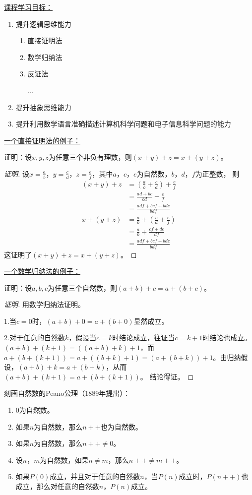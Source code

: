 \documentclass{article}
\begin{document}
\begin{CJK}{UTF8}{gbsn}
\underline{课程学习目标：}
\begin{enumerate}
\item 提升逻辑思维能力
  \begin{enumerate}
  \item 直接证明法
  \item 数学归纳法
  \item 反证法

    ...
  \end{enumerate}
\item 提升抽象思维能力
\item 提升利用数学语言准确描述计算机科学问题和电子信息科学问题的能力
\end{enumerate}

\underline{一个直接证明法的例子：}

证明：设$x, y, z$为任意三个非负有理数，则$(x + y) + z = x + (y + z)$。
\begin{proof}[证明]
  设$x=\frac{a}{b}$，$y=\frac{c}{d}$，$z=\frac{e}{f}$，其中$a$，$c$，$e$为自然数，$b$，$d$，$f$为正整数，
  则
  \begin{align*}
    (x + y) + z&=(\frac{a}{b}+\frac{c}{d})+\frac{e}{f}\\
               &=\frac{ad+bc}{bd}+\frac{e}{f}\\
    &=\frac{adf+bcf+bde}{bdf}\\
    x + (y + z)&=\frac{a}{b}+(\frac{c}{d}+\frac{e}{f})\\
               &=\frac{a}{b} + \frac{cf + de}{df}\\
    &=\frac{adf+bcf+bde}{bdf}    
  \end{align*}
  这证明了$(x + y) + z = x + (y + z)$。
\end{proof}

\underline{一个数学归纳法的例子：}

证明：设$a, b, c$为任意三个自然数，则$(a + b) + c = a + (b + c)$。

\begin{proof}[证明]
  用数学归纳法证明。

  1.当$c=0$时，$(a+b)+0=a+(b+0)$显然成立。

  2.对于任意的自然数$k$，假设当$c=k$时结论成立，往证当$c=k+1$时结论也成立。$(a+b)+(k+1)=((a+b)+k)+1$，而$a+(b+(k+1))=a+((b+k)+1)=(a+(b+k))+1$。由归纳假设，$(a+b)+k=a+(b+k)$，从而$(a+b)+(k+1)=a+(b+(k+1))$。
  结论得证。
\end{proof}


刻画自然数的Peano公理（1889年提出）：
\begin{enumerate}
    \item 0为自然数。
    \item 如果$n$为自然数，那么$n++$也为自然数。
    \item 如果$n$为自然数，那么$n++ \neq 0$。
    \item 设$n$，$m$为自然数，如果$n \neq m$，那么$n++ \neq m++$。
    \item 如果$P(0)$成立，并且对于任意的自然数$n$，当$P(n)$成立时，$P(n++)$也成立，那么对任意的自然数$n$，$P(n)$成立。 
    \end{enumerate}


\end{CJK}
\end{document}
